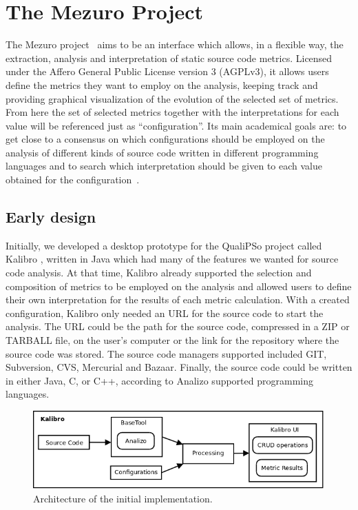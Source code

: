 \section{The Mezuro Project}
\label{sec:mezuro}

The Mezuro project~\cite{mezuro2012} aims to be an interface which allows, in a
flexible way, the extraction, analysis and interpretation of static source code
metrics. Licensed under the Affero General Public License version 3 (AGPLv3),
it allows users define the metrics they want to employ on the analysis, keeping
track and providing graphical visualization of the evolution of the selected
set of metrics. From here the set of selected metrics together with the
interpretations for each value  will be referenced just as ``configuration''.
Its main academical goals are: to get close to a consensus on which
configurations should be employed on the analysis of different kinds of source
code written in different programming languages and to search which
interpretation should be given to each value obtained for the
configuration~\cite{meirelles2013}.

\subsection{Early design}
\label{subsec:early-design}

Initially, we developed a desktop prototype for the QualiPSo project called
Kalibro \cite{de2013kalibro}, written in Java which had many of the features we
wanted for source code analysis. At that time, Kalibro already supported the
selection and composition of metrics to be employed on the analysis and allowed
users to define their own interpretation for the results of each metric
calculation.  With a created configuration, Kalibro only needed an URL for the
source code to start the analysis. The URL could be the path for the source
code, compressed in a ZIP or TARBALL file, on the user's computer or the link
for the repository where the source code was stored. The source code managers
supported included GIT, Subversion, CVS, Mercurial and Bazaar. Finally, the
source code could be written in either Java, C, or C++, according to Analizo
supported programming languages.

\begin{figure}[htb]
  \centering
  \includegraphics[width=.85\textwidth]{images/kalibro-initial-arch.png}
  \caption{Architecture of the initial implementation.}
  \label{fig:kalibro-initial-arch}
\end{figure}

